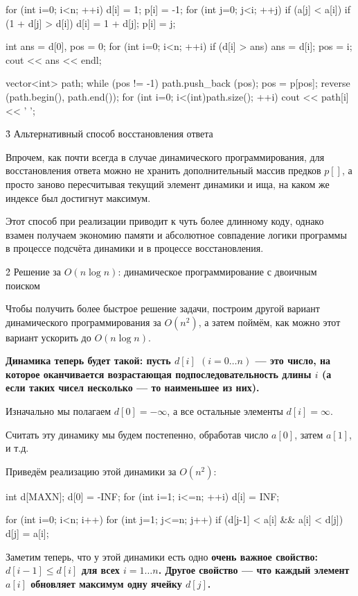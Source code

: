 for (int i=0; i<n; ++i) {
	d[i] = 1;
	p[i] = -1;
	for (int j=0; j<i; ++j)
		if (a[j] < a[i])
			if (1 + d[j] > d[i]) {
				d[i] = 1 + d[j];
				p[i] = j;
			}
}

int ans = d[0],  pos = 0;
for (int i=0; i<n; ++i)
	if (d[i] > ans) {
		ans = d[i];
		pos = i;
	}
cout << ans << endl;

vector<int> path;
while (pos != -1) {
	path.push_back (pos);
	pos = p[pos];
}
reverse (path.begin(), path.end());
for (int i=0; i<(int)path.size(); ++i)
	cout << path[i] << ' ';
\endcode


\h3{ Альтернативный способ восстановления ответа }

Впрочем, как почти всегда в случае динамического программирования, для восстановления ответа можно не хранить дополнительный массив предков $p[]$, а просто заново пересчитывая текущий элемент динамики и ища, на каком же индексе был достигнут максимум.

Этот способ при реализации приводит к чуть более длинному коду, однако взамен получаем экономию памяти и абсолютное совпадение логики программы в процессе подсчёта динамики и в процессе восстановления.



\h2{ Решение за $O (n \log n)$: динамическое программирование с двоичным поиском }

Чтобы получить более быстрое решение задачи, построим другой вариант динамического программирования за $O (n^2)$, а затем поймём, как можно этот вариант ускорить до $O (n \log n)$.

\bf{Динамика} теперь будет такой: пусть $d[i]$ $(i = 0 \ldots n)$ --- это число, на которое оканчивается возрастающая подпоследовательность длины $i$ (а если таких чисел несколько --- то наименьшее из них).

Изначально мы полагаем $d[0] = -\infty$, а все остальные элементы $d[i] = \infty$.

Считать эту динамику мы будем постепенно, обработав число $a[0]$, затем $a[1]$, и т.д.

Приведём реализацию этой динамики за $O (n^2)$:

\code
int d[MAXN];
d[0] = -INF;
for (int i=1; i<=n; ++i)
	d[i] = INF;

for (int i=0; i<n; i++)
	for (int j=1; j<=n; j++)
		if (d[j-1] < a[i] && a[i] < d[j])
			d[j] = a[i];
\endcode

Заметим теперь, что у этой динамики есть одно \bf{очень важное свойство}: $d[i-1] \le d[i]$ для всех $i = 1 \ldots n$. Другое свойство --- что каждый элемент $a[i]$ обновляет максимум одну ячейку $d[j]$.

